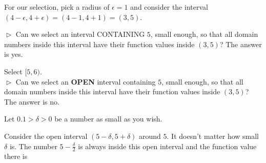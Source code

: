 \documentclass{ximera}
\begin{document}
\begin{example}
\begin{explanation}
For our selection, pick a radius of $\epsilon = 1$ and consider the interval $(4-\epsilon , 4+\epsilon) = (4-1 , 4+1) = (3,5)$. \\


\begin{image}
\end{image}





$\vartriangleright$ Can we select an interval CONTAINING $5$, small enough, so that all domain numbers inside this interval have their function values inside $(3,5)$?  The answer is yes.

Select $[5, 6)$. \\



$\vartriangleright$ Can we select an \textbf{\textcolor{red!80!black}{OPEN}} interval containing $5$, small enough, so that all domain numbers inside this interval have their function values inside $(3,5)$?  The answer is no.




Let $0.1 > \delta > 0$ be a number as small as you wish.

Consider the open interval $(5-\delta, 5+\delta)$ around $5$. It doesn't matter how small $\delta$ is.  The number $5 - \frac{\delta}{2}$ is always inside this open interval and the function value there is 


\end{explanation}
\end{example}
\end{document}
